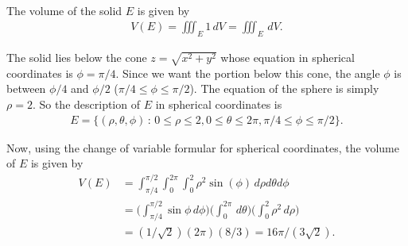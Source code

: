 	\spc
	
	\\
	The volume of the solid $E$ is given by
		\begin{align*}
		V (E) = \iiint_E 1 \, dV = \iiint_E \, dV .
		\end{align*}
	
	The solid lies below the cone $z = \sqrt{x^2 + y^2}$ whose equation in spherical coordinates is $\phi = \pi/4$. Since we want the portion below this cone, the angle $\phi$ is between $\phi/4$ and $\phi/2$ ($\pi/4 \leq \phi \leq \pi/2$). The equation of the sphere is simply $\rho = 2$. So the description of $E$ in spherical coordinates is
		\begin{align*}
		E = \{ (\rho , \theta , \phi ) \, : \, 0 \leq \rho \leq 2 , 0 \leq \theta \leq 2\pi , \pi/4 \leq \phi \leq \pi/2 \} .
		\end{align*}
		
	Now, using the change of variable formular for spherical coordinates, the volume of $E$ is given by
		\begin{align*}
		V (E) &= \int_{\pi/4}^{\pi/2} \int_0^{2\pi} \int_0^2 \rho^2 \sin (\phi ) \, d\rho d \theta d \phi \\
		&= \Big( \int_{\pi/4}^{\pi/2} \sin \phi \, d\phi \Big) \Big( \int_0^{2\pi} \, d\theta \Big) \Big( \int_0^2 \rho^2 \, d \rho \Big)\\
		&= (1/\sqrt{2})(2\pi) (8/3) = 16\pi/(3\sqrt{2}) .
		\end{align*}

